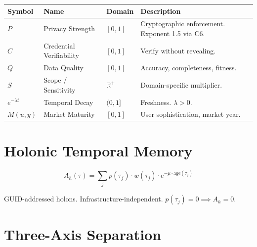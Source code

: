 \documentclass[
  11pt,
]{article}
\newcounter{none} %
\begin{document}
{\def\LTcaptype{none} %
\begin{longtable}[]{@{}
  >{\raggedright\arraybackslash}p{}
  >{\raggedright\arraybackslash}p{}
  >{\raggedright\arraybackslash}p{}
  >{\raggedright\arraybackslash}p{}@{}}
\toprule\noalign{}
\begin{minipage}[b]{\linewidth}\raggedright
Symbol
\end{minipage} & \begin{minipage}[b]{\linewidth}\raggedright
Name
\end{minipage} & \begin{minipage}[b]{\linewidth}\raggedright
Domain
\end{minipage} & \begin{minipage}[b]{\linewidth}\raggedright
Description
\end{minipage} \\
\midrule\noalign{}
\endhead
\bottomrule\noalign{}
\endlastfoot
\(P\) & Privacy Strength & \([0,1]\) & Cryptographic enforcement.
Exponent 1.5 via C6. \\
\(C\) & Credential Verifiability & \([0,1]\) & Verify without
revealing. \\
\(Q\) & Data Quality & \([0,1]\) & Accuracy, completeness, fitness. \\
\(S\) & Scope / Sensitivity & \(\mathbb{R}^+\) & Domain-specific
multiplier. \\
\(e^{-\lambda t}\) & Temporal Decay & \((0,1]\) & Freshness.
\(\lambda > 0\). \\
\(M(u,y)\) & Market Maturity & \([0,1]\) & User sophistication, market
year. \\
\end{longtable}
}

\section{Holonic Temporal Memory}\label{holonic-temporal-memory}

\[A_h(\tau) = \sum_j p(\tau_j) \cdot w(\tau_j) \cdot e^{-\mu \cdot \text{age}(\tau_j)}\]

GUID-addressed holons. Infrastructure-independent.
\(p(\tau_j) = 0 \implies A_h = 0\).

\section{Three-Axis Separation}\label{three-axis-separation}
\end{document}
